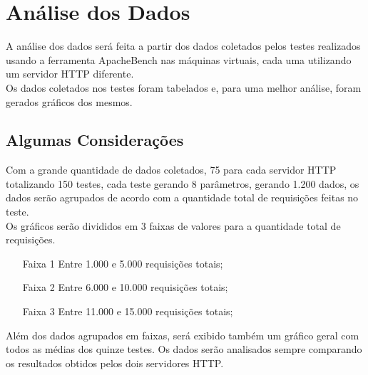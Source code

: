 \chapter{Análise dos Dados}\label{cap:analise-dos-dados}

A análise dos dados será feita a partir dos dados coletados pelos testes realizados usando a ferramenta ApacheBench nas máquinas virtuais, cada uma utilizando um servidor HTTP diferente.\\
Os dados coletados nos testes foram tabelados e, para uma melhor análise, foram gerados gráficos dos mesmos.

\section{Algumas Considerações}
Com a grande quantidade de dados coletados, 75 para cada servidor HTTP totalizando 150 testes, cada teste gerando 8 parâmetros, gerando 1.200 dados, os dados serão agrupados de acordo com a quantidade total de requisições feitas no teste. \\
Os gráficos serão divididos em 3 faixas de valores para a quantidade total de requisições.
\begin{itemize}
	\item[Faixa 1] Entre 1.000 e 5.000 requisições totais;
	\item[Faixa 2] Entre 6.000 e 10.000 requisições totais;
	\item[Faixa 3] Entre 11.000 e 15.000 requisições totais;
\end{itemize}
Além dos dados agrupados em faixas, será exibido também um gráfico geral com 
todos as médias dos quinze testes.
Os dados serão analisados sempre comparando os resultados obtidos pelos dois servidores HTTP.\\

